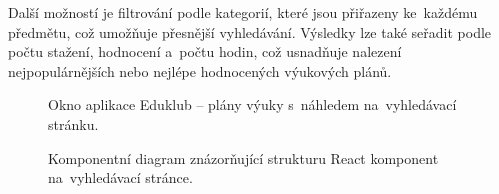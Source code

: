 \documentclass[male,czech,api_bc]{kitheses}
\begin{document}
Další možností je filtrování podle kategorií, které jsou přiřazeny ke~každému předmětu, což umožňuje přesnější vyhledávání. Výsledky lze také seřadit podle počtu stažení, hodnocení a~počtu hodin, což usnadňuje nalezení nejpopulárnějších nebo nejlépe hodnocených výukových plánů.

\begin{figure}[H]
	\centering
	\caption{Okno aplikace Eduklub – plány výuky s~náhledem na~vyhledávací stránku.}
	\label{fig:eduklub-3}
\end{figure}

\begin{figure}[H]
	\centering
	\caption{Komponentní diagram znázorňující strukturu React komponent na~vyhledávací stránce.}
	\label{fig:component-diagram-react-3}
\end{figure}
\end{document}
